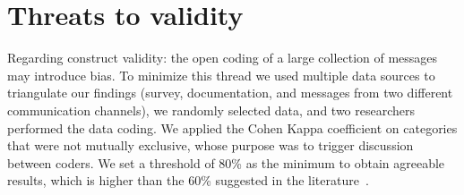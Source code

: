 


\section{Threats to validity}
\label{cha:threats}


Regarding construct validity: the open coding of a large collection of messages may introduce bias.  To minimize this thread we used multiple data sources to
triangulate our findings (survey, documentation, and messages from two different communication channels), we randomly selected data, and two researchers
performed the data coding. We applied the Cohen Kappa coefficient on categories that were not mutually exclusive, whose purpose was to trigger discussion
between coders.  We set a threshold of 80\% as the minimum to obtain agreeable results, which is higher than the 60\% suggested in the
literature~\cite{Landis1977}. 

